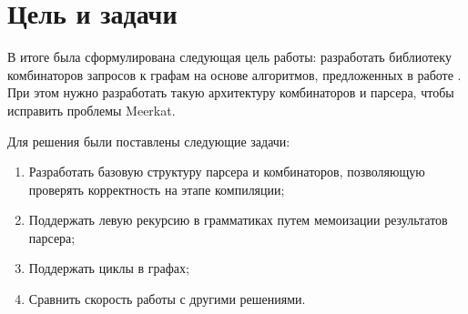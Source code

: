 \chapter{Цель и задачи}
\label{ch:ch2}

В итоге была сформулирована следующая цель работы: разработать библиотеку комбинаторов запросов к графам
на основе алгоритмов, предложенных в работе \cite{Meerkat}. При этом нужно разработать такую архитектуру комбинаторов и парсера, чтобы исправить проблемы Meerkat.

Для решения были поставлены следующие задачи:
\begin{enumerate}
    \item Разработать базовую структуру парсера и комбинаторов, позволяющую проверять корректность на этапе компиляции;
    \item Поддержать левую рекурсию в грамматиках путем мемоизации результатов парсера;
    \item Поддержать циклы в графах;
    \item Сравнить скорость работы с другими решениями.
\end{enumerate} 
